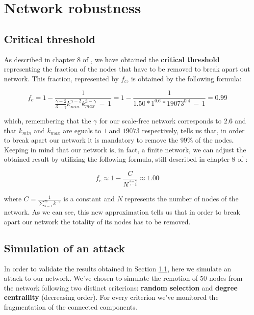 \chapter{Network robustness} %
\label{cha:network_robustness}
    \section{Critical threshold} %
    \label{sec:critical_threshold}
        As described in chapter 8 of \cite{network_science}, we have obtained the \textbf{critical threshold}
        representing the fraction of the nodes that have to be removed to break apart out network. This fraction,
        represented by $f_c$, is obtained by the following formula:

        \begin{equation*}
            f_c = 1 - \frac{1}
            {\frac{\gamma - 2}{3 - \gamma}k^{\gamma - 2}_{\mathit{min}}k^{3 - \gamma}_{\mathit{max}} \ - \  1} =
            1 - \frac{1}{1.50 * 1^{0.6} * 19073^{0.4} \ - \ 1} = 0.99
        \end{equation*}

        which, remembering that the $\gamma$ for our scale-free network corresponds to $2.6$ and that
        $k_{\mathit{min}}$ and $k_{\mathit{max}}$ are eguals to $1$ and $19073$ respectively, tells us that, in
        order to break apart our network it is mandatory to remove the $99\%$ of the nodes. Keeping in mind that
        our network is, in fact, a finite network, we can adjust the obtained result by utilizing the following
        formula, still described in chapter 8 of \cite{network_science}:

        \begin{equation*}
            f_c \approx 1 - \frac{C}{N^{\frac{3 - \gamma}{\gamma - 1}}} \approx 1.00
        \end{equation*}

        where $C = \frac{1}{\sum_{k=1}^{\infty}k^{-\gamma}}$ is a constant and $N$ represents the number of nodes
        of the network. As we can see, this new approximation tells us that in order to break apart our network the
        totality of its nodes has to be removed.
    \section{Simulation of an attack} %
    \label{sec:simulation_of_an_attack}
        In order to validate the results obtained in Section \ref{sec:critical_threshold}, here we simulate an
        attack to our network. We've chosen to simulate the remotion of $50$ nodes from the network following two
        distinct criterions: \textbf{random selection} and \textbf{degree centraility} (decreasing order). For every
        criterion we've monitored the fragmentation of the connected components.

